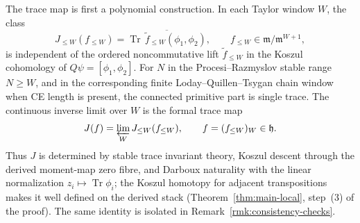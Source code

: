 \documentclass[11pt]{memoir}
\begin{document}
The trace map is first a polynomial construction.  In each Taylor
window \(W\), the class
\[
  J_{\leq W}(f_{\leq W})
  =
  \overline{\operatorname{Tr}\,\tilde f_{\leq W}(\phi_1,\phi_2)},\qquad
  f_{\leq W}\in \mathfrak m/\mathfrak m^{W+1},
\]
is independent of the ordered noncommutative lift \(\tilde f_{\leq W}\) in the
Koszul cohomology of \(Q\psi=[\phi_1,\phi_2]\).  For \(N\) in the
Procesi--Razmyslov stable range \(N\geq W\), and in the corresponding
finite Loday--Quillen--Tsygan chain window when CE length is present,
the connected primitive part is single trace.  The continuous inverse
limit over \(W\) is the formal trace map
\[
  J(f)=\varprojlim_W J_{\leq W}(f_{\leq W}),\qquad
  f=(f_{\leq W})_W\in\mathfrak h .
\]
Thus \(J\) is determined by stable trace invariant theory, Koszul
descent through the derived moment-map zero fibre, and Darboux
naturality with the linear normalization \(z_i\mapsto
\operatorname{Tr}\phi_i\); the Koszul homotopy for adjacent
transpositions makes it well defined on the derived stack
  (Theorem~\ref{thm:main-local}, step~(3) of the proof).  The same
  identity is isolated in Remark~\ref{rmk:consistency-checks}.
\end{document}
